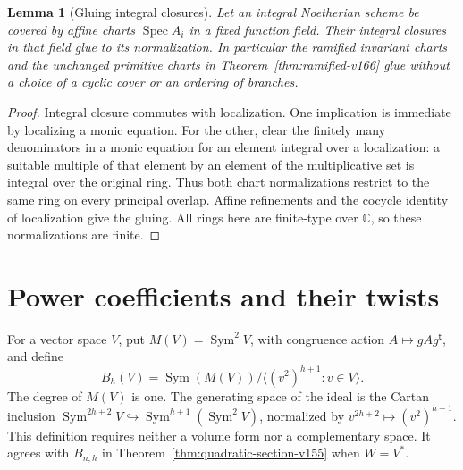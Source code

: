 \documentclass[11pt,reqno]{amsart}
\numberwithin{equation}{section}
\newtheorem{lemma}[theorem]{Lemma}
\theoremstyle{definition}\newtheorem{definition}[theorem]{Definition}
\theoremstyle{remark}\newtheorem{remark}[theorem]{Remark}
\newcommand{\C}{\mathbb C}\newcommand{\Q}{\mathbb Q}
\DeclareMathOperator{\Sym}{Sym}\DeclareMathOperator{\Gr}{Gr}
\DeclareMathOperator{\Spec}{Spec}\DeclareMathOperator{\PGL}{PGL}
\begin{document}
\begin{lemma}[Gluing integral closures]\label{lem:normalization-gluing-v167}
Let an integral Noetherian scheme be covered by affine charts
$\Spec A_i$ in a fixed function field. Their integral closures
in that field glue to its normalization. In particular the
ramified invariant charts and the unchanged primitive charts
in Theorem~\ref{thm:ramified-v166} glue without a choice of a
cyclic cover or an ordering of branches.
\end{lemma}
\begin{proof}
Integral closure commutes with localization. One implication is
immediate by localizing a monic equation. For the other, clear
the finitely many denominators in a monic equation for an element
integral over a localization: a suitable multiple of that element
by an element of the multiplicative set is integral over the
original ring. Thus both chart normalizations restrict to the
same ring on every principal overlap. Affine refinements and the
cocycle identity of localization give the gluing. All rings here
are finite-type over $\C$, so these normalizations are finite.
\end{proof}

\section{Power coefficients and their twists}
\label{sec:power-conventions-v158}
For a vector space $V$, put $M(V)=\Sym^2V$, with congruence action
$A\mapsto gAg^{\mathsf t}$, and define
\begin{equation}\label{eq:envelope-presentation-v158}
 B_h(V)=\Sym(M(V))/\langle (v^2)^{h+1}:v\in V\rangle .
\end{equation}
The degree of $M(V)$ is one. The generating space of the ideal is the
Cartan inclusion $\Sym^{2h+2}V\hookrightarrow\Sym^{h+1}(\Sym^2V)$,
normalized by $v^{2h+2}\mapsto(v^2)^{h+1}$. This definition requires
neither a volume form nor a complementary space. It agrees with
$B_{n,h}$ in Theorem~\ref{thm:quadratic-section-v155} when $W=V^*$.
\end{document}
